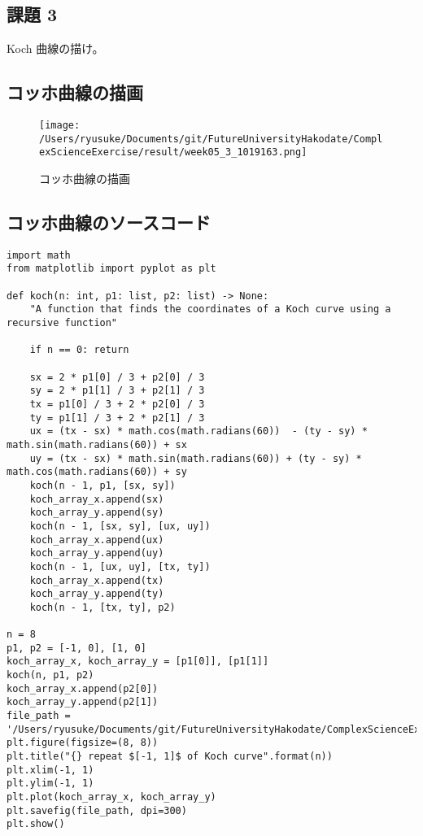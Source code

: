 \documentclass[dvipdfmx,uplatex]{jsarticle}
\begin{document}
\newpage

\subsection{課題 3}
  Koch 曲線の描け。\\

\subsection{コッホ曲線の描画}
  \begin{figure}[htbp]
    \begin{center}
    \texttt{[image: /Users/ryusuke/Documents/git/FutureUniversityHakodate/ComplexScienceExercise/result/week05\_3\_1019163.png]}
    \caption{コッホ曲線の描画}
    \end{center}
  \end{figure}

\newpage

\subsection{コッホ曲線のソースコード}

\begin{lstlisting}[caption=Pythonによるコッホ曲線の描画]
import math
from matplotlib import pyplot as plt

def koch(n: int, p1: list, p2: list) -> None:
    "A function that finds the coordinates of a Koch curve using a recursive function"

    if n == 0: return

    sx = 2 * p1[0] / 3 + p2[0] / 3
    sy = 2 * p1[1] / 3 + p2[1] / 3
    tx = p1[0] / 3 + 2 * p2[0] / 3
    ty = p1[1] / 3 + 2 * p2[1] / 3
    ux = (tx - sx) * math.cos(math.radians(60))  - (ty - sy) * math.sin(math.radians(60)) + sx
    uy = (tx - sx) * math.sin(math.radians(60)) + (ty - sy) * math.cos(math.radians(60)) + sy
    koch(n - 1, p1, [sx, sy])
    koch_array_x.append(sx)
    koch_array_y.append(sy)
    koch(n - 1, [sx, sy], [ux, uy])
    koch_array_x.append(ux)
    koch_array_y.append(uy)
    koch(n - 1, [ux, uy], [tx, ty])
    koch_array_x.append(tx)
    koch_array_y.append(ty)
    koch(n - 1, [tx, ty], p2)

n = 8
p1, p2 = [-1, 0], [1, 0]
koch_array_x, koch_array_y = [p1[0]], [p1[1]]
koch(n, p1, p2)
koch_array_x.append(p2[0])
koch_array_y.append(p2[1])
file_path = '/Users/ryusuke/Documents/git/FutureUniversityHakodate/ComplexScienceExercise/result/week05_3_1019163'
plt.figure(figsize=(8, 8))
plt.title("{} repeat $[-1, 1]$ of Koch curve".format(n))
plt.xlim(-1, 1)
plt.ylim(-1, 1)
plt.plot(koch_array_x, koch_array_y)
plt.savefig(file_path, dpi=300)
plt.show()
\end{lstlisting}
\end{document}
